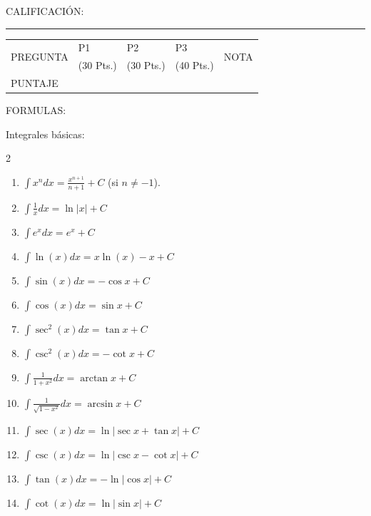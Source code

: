 \documentclass{article}
\begin{document}
{\large CALIFICACIÓN:}\\
\rule[0mm]{175mm}{0.1mm}
\begin{table}[h]
\begin{center}
\begin{tabular}{||m{2.5cm}||m{2.0cm}|m{2.0cm}|m{2.0cm}||m{1.5cm}||}
  \hline
  \hline
  \multirow{2}{*}{PREGUNTA} & P1 & P2 & P3 & \multirow{2}{*}{NOTA}\\
  & (30 Pts.) & (30 Pts.) & (40 Pts.) & \\
  \hline
  \multirow{3}{*}{PUNTAJE} & & & &\\
  & & & & \\
  & & & & \\
  \hline
  \hline
\end{tabular}
\end{center}
\end{table}

\newpage
\noindent\textsf{\large FORMULAS:}
\vspace{3mm}

{\large Integrales básicas:}
\begin{multicols}{2}
  \begin{enumerate}
    \item $\displaystyle\int x^n dx = \frac{x^{n+1}}{n+1}+C$ (si $n\neq -1$).
    \item $\displaystyle\int \frac{1}{x}dx = \ln|x|+C$
    \item $\displaystyle\int e^x dx = e^x+C$
    \item $\displaystyle\int \ln(x) dx = x\ln(x)-x+C$
    \item $\displaystyle\int \sin(x) dx = -\cos x+C$
    \item $\displaystyle\int \cos(x) dx = \sin x+C$
    \item $\displaystyle\int \sec^2(x) dx = \tan x+C$
    \item $\displaystyle\int \csc^2(x) dx = -\cot x+C$
    \item $\displaystyle\int \frac{1}{1+x^2}dx = \arctan x+C$
    \item $\displaystyle\int \frac{1}{\sqrt{1-x^2}}dx = \arcsin x+C$
    \item $\displaystyle\int \sec(x) dx = \ln|\sec x+\tan x|+C$
    \item $\displaystyle\int \csc(x) dx = \ln|\csc x-\cot x|+C$
    \item $\displaystyle\int \tan(x) dx = -\ln|\cos x|+C$
    \item $\displaystyle\int \cot(x) dx = \ln|\sin x|+C$
  \end{enumerate}
\end{multicols}
\vspace{2mm}
\end{document}
